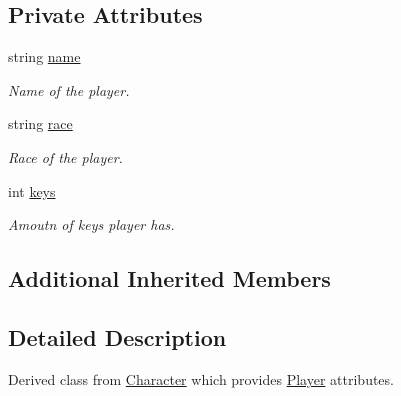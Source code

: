 \subsection*{Private Attributes}
\begin{DoxyCompactItemize}
\item 
string \hyperlink{classPlayer_acf0355128a99ee20ad9931b760fb2de1}{name}
\begin{DoxyCompactList}\small\item\em Name of the player. \end{DoxyCompactList}\item 
string \hyperlink{classPlayer_a5130cb6c4233cd7ad1212af0d1790e58}{race}
\begin{DoxyCompactList}\small\item\em Race of the player. \end{DoxyCompactList}\item 
int \hyperlink{classPlayer_ac46baa685ca2a266178f03b9e9877e65}{keys}
\begin{DoxyCompactList}\small\item\em Amoutn of keys player has. \end{DoxyCompactList}\end{DoxyCompactItemize}
\subsection*{Additional Inherited Members}


\subsection{Detailed Description}
Derived class from \hyperlink{classCharacter}{Character} which provides \hyperlink{classPlayer}{Player} attributes. 

